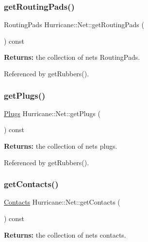 \subsubsection{\texorpdfstring{get\+Routing\+Pads()}{getRoutingPads()}}
{\footnotesize\ttfamily Routing\+Pads Hurricane\+::\+Net\+::get\+Routing\+Pads (\begin{DoxyParamCaption}{ }\end{DoxyParamCaption}) const}

{\bfseries Returns\+:} the collection of net\textquotesingle{}s Routing\+Pads. 

Referenced by get\+Rubbers().

\mbox{\label{classHurricane_1_1Net_a88322672c105405a61a78022359178aa}} 
\subsubsection{\texorpdfstring{get\+Plugs()}{getPlugs()}}
{\footnotesize\ttfamily \hyperlink{namespaceHurricane_ac8335d2057483ee7a935c15a9460c64f}{Plugs} Hurricane\+::\+Net\+::get\+Plugs (\begin{DoxyParamCaption}{ }\end{DoxyParamCaption}) const}

{\bfseries Returns\+:} the collection of net\textquotesingle{}s plugs. 

Referenced by get\+Rubbers().

\mbox{\label{classHurricane_1_1Net_a9c397596fe9ecbf674712c72e0b9010c}} 
\subsubsection{\texorpdfstring{get\+Contacts()}{getContacts()}}
{\footnotesize\ttfamily \hyperlink{namespaceHurricane_a1e6a8ab09f688509bd727b3fee02d0d2}{Contacts} Hurricane\+::\+Net\+::get\+Contacts (\begin{DoxyParamCaption}{ }\end{DoxyParamCaption}) const}

{\bfseries Returns\+:} the collection of net\textquotesingle{}s contacts. 


